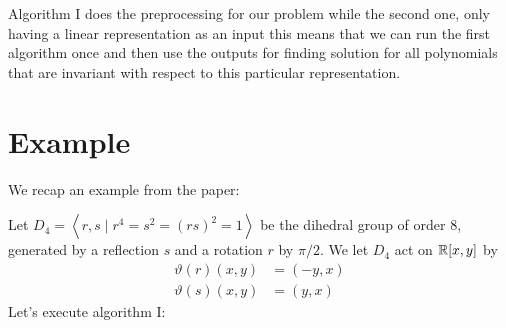 \documentclass[]{article}
\begin{document}
Algorithm I does the preprocessing for our problem while the second one, only having a linear representation as an input
this means that we can run the first algorithm once and then 
use the outputs for finding solution for 
all polynomials that are invariant with respect to this particular representation.


\section*{Example}
We recap an example from the paper:


Let $D_4=\left<r,s\mid r^4=s^2=(rs)^2=1\right>$ be the dihedral group of order $8$, generated by a reflection $s$ and a rotation $r$ by $\pi/2$. We let $D_4$ act on $\mathbb R[x,y]$ by 
\begin{align*}
    \vartheta(r)(x,y)&=(-y,x)\\
    \vartheta(s)(x,y)&=(y,x)
\end{align*}
Let's execute algorithm I:
\end{document}
